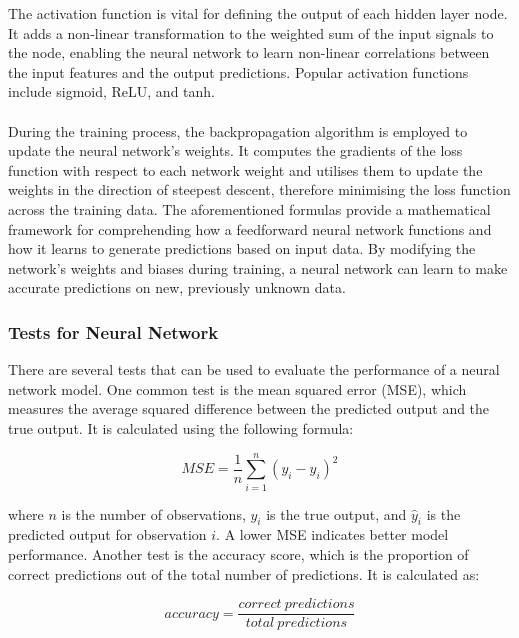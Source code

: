 \documentclass{article}[12pt]
\theoremstyle{definition}
\begin{document}
\newpage

\noindent
The activation function is vital for defining the output of each hidden layer node. It adds a non-linear transformation to the weighted sum of the input signals to the node, enabling the neural network to learn non-linear correlations between the input features and the output predictions. Popular activation functions include sigmoid, ReLU, and tanh.
\\
\\
During the training process, the backpropagation algorithm is employed to update the neural network's weights. It computes the gradients of the loss function with respect to each network weight and utilises them to update the weights in the direction of steepest descent, therefore minimising the loss function across the training data. The aforementioned formulas provide a mathematical framework for comprehending how a feedforward neural network functions and how it learns to generate predictions based on input data. By modifying the network's weights and biases during training, a neural network can learn to make accurate predictions on new, previously unknown data.

\bigskip

\subsubsection{Tests for Neural Network}

\bigskip

There are several tests that can be used to evaluate the performance of a neural network model. One common test is the mean squared error (MSE), which measures the average squared difference between the predicted output and the true output. It is calculated using the following formula:

\begin{equation*}
MSE = \frac{1}{n}\sum_{i=1}^{n}(y_i - \hat{y}_i)^2
\end{equation*}

\noindent
where $n$ is the number of observations, $y_i$ is the true output, and $\hat{y}_i$ is the predicted output for observation $i$. A lower MSE indicates better model performance. Another test is the accuracy score, which is the proportion of correct predictions out of the total number of predictions. It is calculated as:

\begin{equation*}
accuracy = \frac{correct\ predictions}{total\ predictions}
\end{equation*}
\end{document}
